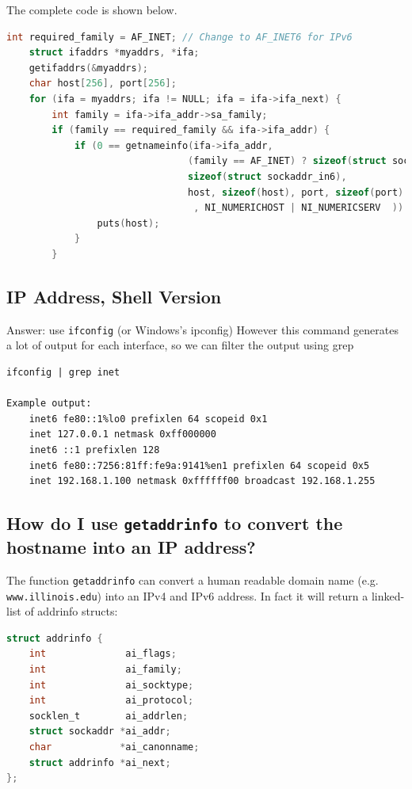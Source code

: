 The complete code is shown below.

\begin{lstlisting}[language=C]
    int required_family = AF_INET; // Change to AF_INET6 for IPv6
    struct ifaddrs *myaddrs, *ifa;
    getifaddrs(&myaddrs);
    char host[256], port[256];
    for (ifa = myaddrs; ifa != NULL; ifa = ifa->ifa_next) {
        int family = ifa->ifa_addr->sa_family;
        if (family == required_family && ifa->ifa_addr) {
            if (0 == getnameinfo(ifa->ifa_addr,
                                (family == AF_INET) ? sizeof(struct sockaddr_in) :
                                sizeof(struct sockaddr_in6),
                                host, sizeof(host), port, sizeof(port)
                                 , NI_NUMERICHOST | NI_NUMERICSERV  ))
                puts(host);
            }
        }
\end{lstlisting}

\subsection{IP Address, Shell Version}\label{whats-my-machines-ip-address-shell-version}

Answer: use \texttt{ifconfig} (or Windows's ipconfig) However this command generates a lot of output for each interface, so we can filter the output using grep

\begin{lstlisting}
ifconfig | grep inet

Example output:
    inet6 fe80::1%lo0 prefixlen 64 scopeid 0x1 
    inet 127.0.0.1 netmask 0xff000000 
    inet6 ::1 prefixlen 128 
    inet6 fe80::7256:81ff:fe9a:9141%en1 prefixlen 64 scopeid 0x5 
    inet 192.168.1.100 netmask 0xffffff00 broadcast 192.168.1.255
\end{lstlisting}

\subsection{\texorpdfstring{How do I use \texttt{getaddrinfo} to convert the hostname into an IP address?}{How do I use getaddrinfo to convert the hostname into an IP address?}}

The function \texttt{getaddrinfo} can convert a human readable domain name (e.g. \texttt{www.illinois.edu}) into an IPv4 and IPv6 address. In fact it will return a linked-list of addrinfo structs:

\begin{lstlisting}[language=C]
struct addrinfo {
    int              ai_flags;
    int              ai_family;
    int              ai_socktype;
    int              ai_protocol;
    socklen_t        ai_addrlen;
    struct sockaddr *ai_addr;
    char            *ai_canonname;
    struct addrinfo *ai_next;
};
\end{lstlisting}

